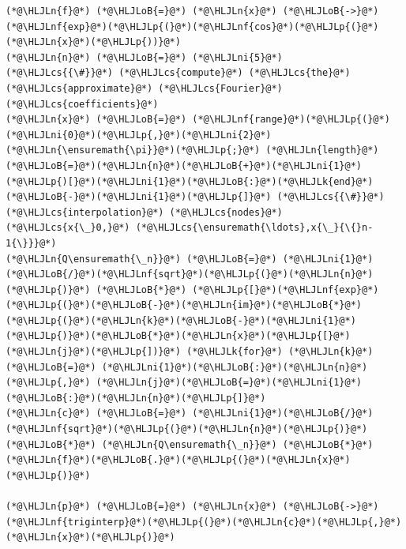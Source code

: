 \documentclass[12pt,landscape]{article}
\newcommand{\HLJLk}[1]{\textcolor[RGB]{148,91,176}{\textbf{#1}}}
\newcommand{\HLJLn}[1]{#1}
\newcommand{\HLJLnf}[1]{\textcolor[RGB]{66,102,213}{#1}}
\newcommand{\HLJLni}[1]{\textcolor[RGB]{59,151,46}{#1}}
\newcommand{\HLJLoB}[1]{\textcolor[RGB]{102,102,102}{\textbf{#1}}}
\newcommand{\HLJLp}[1]{#1}
\newcommand{\HLJLcs}[1]{\textcolor[RGB]{153,153,119}{\textit{#1}}}
\begin{document}
{\begin{lstlisting}
(*@\HLJLn{f}@*) (*@\HLJLoB{=}@*) (*@\HLJLn{x}@*) (*@\HLJLoB{->}@*) (*@\HLJLnf{exp}@*)(*@\HLJLp{(}@*)(*@\HLJLnf{cos}@*)(*@\HLJLp{(}@*)(*@\HLJLn{x}@*)(*@\HLJLp{))}@*)
(*@\HLJLn{n}@*) (*@\HLJLoB{=}@*) (*@\HLJLni{5}@*)
(*@\HLJLcs{{\#}}@*) (*@\HLJLcs{compute}@*) (*@\HLJLcs{the}@*) (*@\HLJLcs{approximate}@*) (*@\HLJLcs{Fourier}@*) (*@\HLJLcs{coefficients}@*)
(*@\HLJLn{x}@*) (*@\HLJLoB{=}@*) (*@\HLJLnf{range}@*)(*@\HLJLp{(}@*)(*@\HLJLni{0}@*)(*@\HLJLp{,}@*)(*@\HLJLni{2}@*)(*@\HLJLn{\ensuremath{\pi}}@*)(*@\HLJLp{;}@*) (*@\HLJLn{length}@*)(*@\HLJLoB{=}@*)(*@\HLJLn{n}@*)(*@\HLJLoB{+}@*)(*@\HLJLni{1}@*)(*@\HLJLp{)[}@*)(*@\HLJLni{1}@*)(*@\HLJLoB{:}@*)(*@\HLJLk{end}@*)(*@\HLJLoB{-}@*)(*@\HLJLni{1}@*)(*@\HLJLp{]}@*) (*@\HLJLcs{{\#}}@*) (*@\HLJLcs{interpolation}@*) (*@\HLJLcs{nodes}@*) (*@\HLJLcs{x{\_}0,}@*) (*@\HLJLcs{\ensuremath{\ldots},x{\_}{\{}n-1{\}}}@*)
(*@\HLJLn{Q\ensuremath{\_n}}@*) (*@\HLJLoB{=}@*) (*@\HLJLni{1}@*)(*@\HLJLoB{/}@*)(*@\HLJLnf{sqrt}@*)(*@\HLJLp{(}@*)(*@\HLJLn{n}@*)(*@\HLJLp{)}@*) (*@\HLJLoB{*}@*) (*@\HLJLp{[}@*)(*@\HLJLnf{exp}@*)(*@\HLJLp{(}@*)(*@\HLJLoB{-}@*)(*@\HLJLn{im}@*)(*@\HLJLoB{*}@*)(*@\HLJLp{(}@*)(*@\HLJLn{k}@*)(*@\HLJLoB{-}@*)(*@\HLJLni{1}@*)(*@\HLJLp{)}@*)(*@\HLJLoB{*}@*)(*@\HLJLn{x}@*)(*@\HLJLp{[}@*)(*@\HLJLn{j}@*)(*@\HLJLp{])}@*) (*@\HLJLk{for}@*) (*@\HLJLn{k}@*) (*@\HLJLoB{=}@*) (*@\HLJLni{1}@*)(*@\HLJLoB{:}@*)(*@\HLJLn{n}@*)(*@\HLJLp{,}@*) (*@\HLJLn{j}@*)(*@\HLJLoB{=}@*)(*@\HLJLni{1}@*)(*@\HLJLoB{:}@*)(*@\HLJLn{n}@*)(*@\HLJLp{]}@*)
(*@\HLJLn{c}@*) (*@\HLJLoB{=}@*) (*@\HLJLni{1}@*)(*@\HLJLoB{/}@*)(*@\HLJLnf{sqrt}@*)(*@\HLJLp{(}@*)(*@\HLJLn{n}@*)(*@\HLJLp{)}@*) (*@\HLJLoB{*}@*) (*@\HLJLn{Q\ensuremath{\_n}}@*) (*@\HLJLoB{*}@*) (*@\HLJLn{f}@*)(*@\HLJLoB{.}@*)(*@\HLJLp{(}@*)(*@\HLJLn{x}@*)(*@\HLJLp{)}@*)

(*@\HLJLn{p}@*) (*@\HLJLoB{=}@*) (*@\HLJLn{x}@*) (*@\HLJLoB{->}@*) (*@\HLJLnf{triginterp}@*)(*@\HLJLp{(}@*)(*@\HLJLn{c}@*)(*@\HLJLp{,}@*) (*@\HLJLn{x}@*)(*@\HLJLp{)}@*)


\end{lstlisting}}
\end{document}
